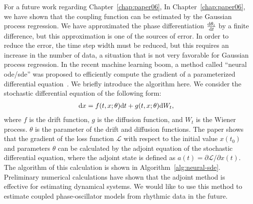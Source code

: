 For a future work regarding Chapter~\ref{chap:paper06},
In Chapter~\ref{chap:paper06}, we have shown that the coupling function can be estimated by the Gaussian process regression.
We have approximated the phase differentiation $\frac{\mathrm{d}\theta_{i}}{\mathrm{d} t}$ by a finite difference,
but this approximation is one of the sources of error.
In order to reduce the error, the time step width must be reduced, but this requires an increase in the number of data, a situation that is not very favorable for Gaussian process regression.
In the recent machine learning boom, a method called ``neural ode/sde'' was proposed to efficiently compute the gradient of a parameterized differential equation~\cite{chen2018,li2020}.
We briefly introduce the algorithm here. We consider the stochastic differential equation of the following form:
\begin{align}
  \mathrm{d} x=f(t,x;\theta)\mathrm{d} t+g(t,x;\theta)\mathrm{d} W_{t},
\end{align}
where $f$ is the drift function, $g$ is the diffusion function, and $W_{t}$ is the Wiener process. $\theta$ is the parameter of the drift and diffusion functions.
The paper \cite{li2020} shows that the gradient of the loss function $\mathcal{L}$ with respect to the initial value $x(t_{0})$ and parameters $\theta$ can be calculated by the adjoint equation of the stochastic differential equation, where the adjoint state is defined as $a(t)=\partial\mathcal{L}/\partial x(t)$.
The algorithm of this calculation is shown in Algorithm~\ref{alg:neural-sde}.
Preliminary numerical calculations have shown that the adjoint method is effective for estimating dynamical systems.
We would like to use this method to estimate coupled phase-oscillator models from rhythmic data in the future.

